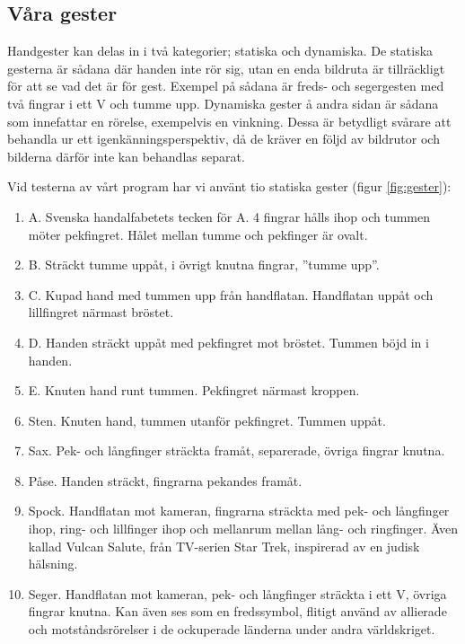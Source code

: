 \documentclass[../rapport_MVEX01-11-05]{subfiles}
\begin{document}
\subsection{Våra gester}
Handgester kan delas in i två kategorier; statiska och dynamiska. De
statiska gesterna är sådana där handen inte rör sig, utan en enda
bildruta är tillräckligt för att se vad det är för gest. Exempel på
sådana är freds- och segergesten med två fingrar i ett V och tumme
upp. Dynamiska gester å andra sidan är sådana som innefattar en
rörelse, exempelvis en vinkning. Dessa är betydligt svårare att
behandla ur ett igenkänningsperspektiv, då de kräver en följd av
bildrutor och bilderna därför inte kan behandlas separat.

Vid testerna av vårt program har vi använt tio statiska gester (figur
\ref{fig:gester}):


\begin{enumerate}
\item A. Svenska handalfabetets tecken för A. 4 fingrar hålls ihop och tummen
  möter pekfingret. Hålet mellan tumme och pekfinger är ovalt.

\item B. Sträckt tumme uppåt, i övrigt knutna fingrar, ''tumme upp''.

\item C. Kupad hand med tummen upp från handflatan. Handflatan uppåt
  och lillfingret närmast bröstet. 

\item D. Handen sträckt uppåt med pekfingret mot bröstet. Tummen böjd
  in i handen.

\item E. Knuten hand runt tummen. Pekfingret närmast kroppen. 

\item Sten. Knuten hand, tummen utanför pekfingret. Tummen uppåt.

\item Sax. Pek- och långfinger sträckta framåt, separerade, övriga
  fingrar knutna.

\item Påse. Handen sträckt, fingrarna pekandes framåt.

\item Spock. Handflatan mot kameran, fingrarna sträckta med pek- och
  långfinger ihop, ring- och lillfinger ihop och mellanrum mellan
  lång- och ringfinger. Även kallad Vulcan Salute, från TV-serien Star
  Trek, inspirerad av en judisk hälsning.

\item Seger. Handflatan mot kameran, pek- och långfinger sträckta i
  ett V, övriga fingrar knutna. Kan även ses som en fredssymbol,
  flitigt använd av allierade och motståndsrörelser i de ockuperade
  länderna under andra världskriget.
\end{enumerate}
\end{document}
